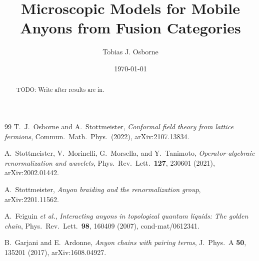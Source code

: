 \documentclass[11pt,a4paper]{article}
\title{Microscopic Models for Mobile Anyons from Fusion Categories}
\author{Tobias J. Osborne}
\date{\today}
\theoremstyle{definition}
\theoremstyle{plain}
\theoremstyle{remark}
\begin{document}
\maketitle

\begin{abstract}
TODO: Write after results are in.
\end{abstract}

\tableofcontents



\begin{thebibliography}{99}
T.~J.~Osborne and A.~Stottmeister,
\emph{Conformal field theory from lattice fermions},
Commun.\ Math.\ Phys.\ (2022),
arXiv:2107.13834.

A.~Stottmeister, V.~Morinelli, G.~Morsella, and Y.~Tanimoto,
\emph{Operator-algebraic renormalization and wavelets},
Phys.\ Rev.\ Lett.\ \textbf{127}, 230601 (2021),
arXiv:2002.01442.

A.~Stottmeister,
\emph{Anyon braiding and the renormalization group},
arXiv:2201.11562.

A.~Feiguin \textit{et al.},
\emph{Interacting anyons in topological quantum liquids: The golden chain},
Phys.\ Rev.\ Lett.\ \textbf{98}, 160409 (2007),
cond-mat/0612341.

B.~Garjani and E.~Ardonne,
\emph{Anyon chains with pairing terms},
J.\ Phys.\ A \textbf{50}, 135201 (2017),
arXiv:1608.04927.
\end{thebibliography}
\end{document}
